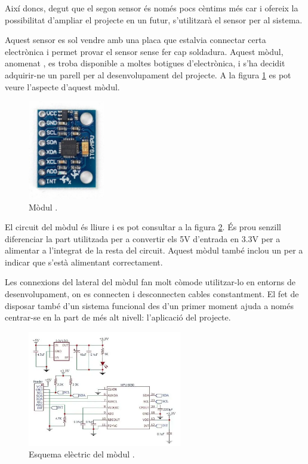 Així doncs, degut que el segon sensor és només pocs cèntims més car i ofereix
la possibilitat d'ampliar el projecte en un futur, s'utilitzarà el sensor
 per al sistema.

Aquest sensor es sol vendre amb una placa que estalvia connectar
certa electrònica i permet provar el sensor sense fer cap soldadura.
Aquest mòdul, anomenat , es troba disponible a moltes botigues
d'electrònica, i s'ha decidit adquirir-ne un parell per al desenvolupament del
projecte. A la figura \ref{fig:gy521img} es pot veure l'aspecte d'aquest mòdul.

\begin{figure}[ht]
    \centering
    \includegraphics[width=0.3\textwidth]{images/modules/gy521img.jpg}
    \caption{Mòdul  \cite{gy521}.}
    \label{fig:gy521img}
\end{figure}

El circuit del mòdul  és lliure i es pot consultar a la figura
\ref{fig:gy521sch}. És prou senzill diferenciar la part utilitzada per a
convertir els 5V d'entrada en 3.3V per a alimentar a l'integrat de la resta
del circuit. Aquest mòdul també inclou un  per a indicar que s'està
alimentant correctament.

Les connexions del lateral del mòdul fan molt còmode utilitzar-lo en entorns de
desenvolupament, on es connecten i desconnecten cables constantment. El fet
de disposar també d'un sistema funcional des d'un primer moment ajuda a
només centrar-se en la part de més alt nivell: l'aplicació del projecte.

\begin{figure}[ht]
    \centering
    \includegraphics[width=0.6\textwidth]{images/modules/gy521sch.png}
    \caption{Esquema elèctric del mòdul  \cite{gy521}.}
    \label{fig:gy521sch}
\end{figure}

